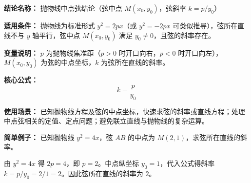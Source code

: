 \textbf{结论名称：} 抛物线中点弦结论（弦中点 \(M(x_0,y_0)\)，弦斜率 \(k=p/y_0\)）\par
\textbf{适用条件：} 抛物线为标准形式 \(y^2=2px\)（或 \(y^2=-2px\) 可类似推导），弦所在直线不与 \(y\) 轴平行，弦中点 \(M(x_0,y_0)\) 满足 \(y_0\neq 0\)，且弦的斜率存在。\par
\textbf{变量说明：} \(p\) 为抛物线焦准距（\(p>0\) 时开口向右，\(p<0\) 时开口向左），\(M(x_0,y_0)\) 为弦的中点坐标，\(k\) 为弦所在直线的斜率。\par
\textbf{核心公式：}
\[
\boxed{k = \frac{p}{y_0}}
\]
\par
\textbf{使用场景：} 已知抛物线方程及弦的中点坐标，快速求弦的斜率或直线方程；处理中点弦相关的定值、定点问题；避免联立直线与抛物线的复杂运算。\par
\textbf{简单例子：} 已知抛物线 \(y^2=4x\)，弦 \(AB\) 的中点为 \(M(2,1)\)，求弦所在直线的斜率。\par
由 \(y^2=4x\) 得 \(2p=4\)，即 \(p=2\)。中点纵坐标 \(y_0=1\)，代入公式得斜率 \(k = p/y_0 = 2/1 = 2\)。因此弦所在直线的斜率为 \(2\)。\par